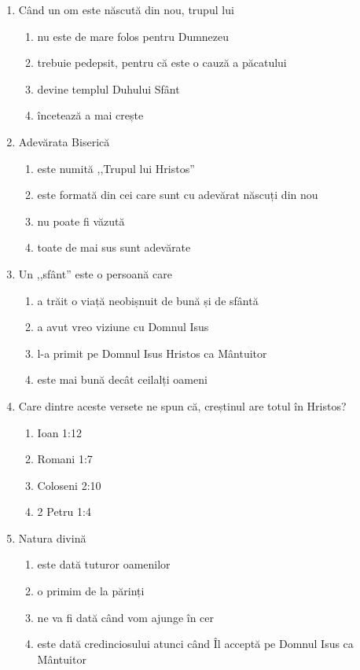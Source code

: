 \begin{enumerate}[itemsep=19pt]
	\item Când un om este născută din nou, trupul lui
		\begin{enumerate}
			\item nu este de mare folos pentru Dumnezeu
			\item trebuie pedepsit, pentru că este o cauză a păcatului
			\item devine templul Duhului Sfânt
			\item încetează a mai crește
		\end{enumerate}
		
	\item Adevărata Biserică
		\begin{enumerate}
			\item este numită ,,Trupul lui Hristos''
			\item este formată din cei care sunt cu adevărat născuți din nou
			\item nu poate fi văzută
			\item toate de mai sus sunt adevărate
			\liniescurta
		\end{enumerate}
		
	\item Un ,,sfânt'' este o persoană care
		\begin{enumerate}
			\item a trăit o viață neobișnuit de bună și de sfântă
			\item a avut vreo viziune cu Domnul Isus
			\item l-a primit pe Domnul Isus Hristos ca Mântuitor
			\item este mai bună decât ceilalți oameni
			\liniescurta
		\end{enumerate}
		
	\item Care dintre aceste versete ne spun că, creștinul are totul în Hristos?
		\begin{enumerate}
			\item Ioan 1:12
			\item Romani 1:7
			\item Coloseni 2:10
			\item 2 Petru 1:4
			\liniescurta
		\end{enumerate}
		
	\item Natura divină
		\begin{enumerate}
			\item este dată tuturor oamenilor
			\item o primim de la părinți
			\item ne va fi dată când vom ajunge în cer
			\item este dată credinciosului atunci când Îl acceptă pe Domnul Isus ca Mântuitor
			\liniescurta
		\end{enumerate}
		

\end{enumerate}
